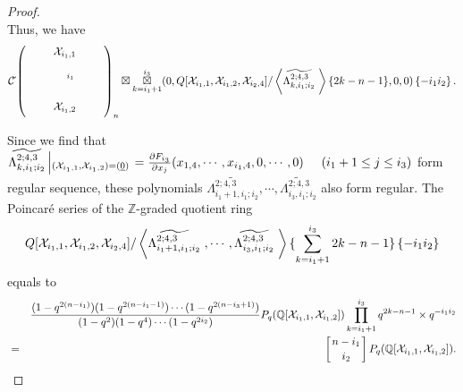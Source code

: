 \documentclass[10pt]{amsart}
\theoremstyle{break}
\begin{document}
\begin{proof}
\begin{equation*}
\end{equation*}
Thus, we have
\begin{eqnarray*}
{{\mathcal{C}}}\acute{}\left( 
\unitlength 0.1in
\begin{picture}(  10.00,  5.0000)(  -2.000,-7.0000)
\special{pn 8}\special{pa 300 900}\special{pa 300 400}\special{fp}\special{sh 1}\special{pa 300 400}\special{pa 280 468}\special{pa 300 454}\special{pa 320 468}\special{pa 300 400}\special{fp}\put(3.750000,-6.0000){\makebox(0,0){${}_{i_1}$}}\put(3.0000,-10.0000){\makebox(0,0){$\mathcal{X}_{i_1,2}$}}\put(3.0000,-3.0000){\makebox(0,0){$\mathcal{X}_{i_1,1}$}}\end{picture}
\right)_n\boxtimes
\mathop{\boxtimes}_{k=i_1+1}^{i_3}
(0,Q[\mathcal{X}_{i_{1},1},\mathcal{X}_{i_{1},2},\mathcal{X}_{i_{2},4}]/\left< \widetilde{\Lambda_{k,i_1;i_2}^{2;4,3}}\hspace{1mm}\right>\{2k-n-1\},0,0)
\left\{ -i_1 i_2 \right\}.\\
\end{eqnarray*}

Since we find that $\widetilde{\Lambda_{k,i_1;i_2}^{2;4,3}}
\left|_{(\mathcal{X}_{i_1,1},\mathcal{X}_{i_1,2})=(\underline{0})}\right.
=\frac{\partial F_{i_3}}{\partial x_{j}}(x_{1,4},\cdots,x_{i_1,4},0,\cdots,0)
\hspace{.5cm}
(i_1+1\le j\le i_3)$ form regular sequence,
these polynomials $\widetilde{\Lambda_{i_1+1,i_1;i_2}^{2;4,3}},\cdots,\widetilde{\Lambda_{i_3,i_1;i_2}^{2;4,3}} $ also form regular. The Poincar\'e series of the ${{\mathbb{Z}}}$-graded quotient ring 
\begin{equation*}
Q[\mathcal{X}_{i_{1},1},\mathcal{X}_{i_{1},2},\mathcal{X}_{i_{2},4}]/
\left< \widetilde{\Lambda_{i_1+1,i_1;i_2}^{2;4,3}}\hspace{1mm},\cdots ,\widetilde{\Lambda_{i_3,i_1;i_2}^{2;4,3}}\hspace{1mm}\right>\{\sum_{k=i_1+1}^{i_3}2k-n-1\}\left\{ -i_1 i_2 \right\}
\end{equation*}
equals to
\begin{eqnarray*}
&&\frac{(1-q^{2(n-i_1)})(1-q^{2(n-i_1-1)})\cdots (1-q^{2(n-i_3+1)})}{(1-q^2)(1-q^4)\cdots (1-q^{2i_2})} P_q ({{\mathbb{Q}}} [\mathcal{X}_{i_{1},1},\mathcal{X}_{i_{1},2}])
\prod_{k=i_1+1}^{i_3}q^{2k-n-1}\times q^{-i_1 i_2}\\[-0.1em]
&=&\left[n-i_1\atop i_2\right]P_q ({{\mathbb{Q}}} [\mathcal{X}_{i_{1},1},\mathcal{X}_{i_{1},2}]).
\end{eqnarray*}


\end{proof}
\end{document}
